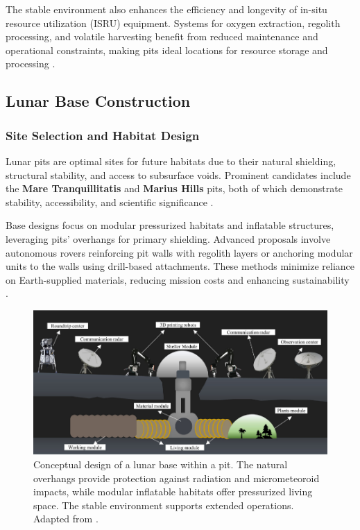 The stable environment also enhances the efficiency and longevity of in-situ resource utilization (ISRU) equipment. Systems for oxygen extraction, regolith processing, and volatile harvesting benefit from reduced maintenance and operational constraints, making pits ideal locations for resource storage and processing \cite{thermal-lunar-pits}.

\subsection{Lunar Base Construction}

\subsubsection{Site Selection and Habitat Design}

Lunar pits are optimal sites for future habitats due to their natural shielding, structural stability, and access to subsurface voids. Prominent candidates include the \textbf{Mare Tranquillitatis} and \textbf{Marius Hills} pits, both of which demonstrate stability, accessibility, and scientific significance \cite{new-wagner, Carrer2024}.

Base designs focus on modular pressurized habitats and inflatable structures, leveraging pits’ overhangs for primary shielding. Advanced proposals involve autonomous rovers reinforcing pit walls with regolith layers or anchoring modular units to the walls using drill-based attachments. These methods minimize reliance on Earth-supplied materials, reducing mission costs and enhancing sustainability \cite{bases-feng}.

\begin{figure}[H]
    \centering
    \includegraphics[width=0.75\linewidth]{simple-base-schema.png}
    \caption{Conceptual design of a lunar base within a pit. The natural overhangs provide protection against radiation and micrometeoroid impacts, while modular inflatable habitats offer pressurized living space. The stable environment supports extended operations. Adapted from \cite{bases-feng}.}
    \label{fig:lunar-pit-habitat-concept}
\end{figure}

